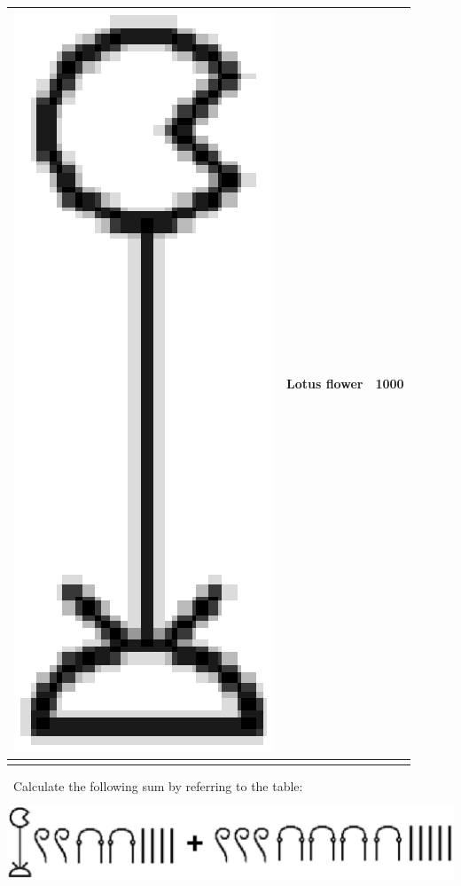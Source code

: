 \documentclass[letterpaper, 12pt]{article}
\begin{document}
\begin{center}
\begin{tabular}{|c|c|c|}
\includegraphics[scale=0.08]{Hiero1000.eps} & Lotus flower & 1000\\[4mm] \hline
\multicolumn{3}{c}{}\\
\end{tabular}
\end{center}

\ Calculate the following sum by referring to the table:
\begin{center}
\includegraphics[scale=0.35]{1569.eps}\\
\end{center}
\end{document}
